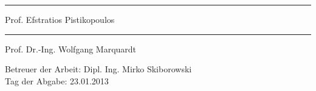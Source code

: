  \vfill{
\begin{flushright}
	\begin{minipage}[r]{10cm}
		\begin{center}
			\hrule\vspace*{2ex}Prof. Efstratios Pistikopoulos\\
			\vspace{2cm}
			\hrule\vspace*{2ex}Prof. Dr.-Ing. Wolfgang Marquardt\\
			\vspace{1cm}
		\end{center}
	\end{minipage}
\end{flushright}
}

Betreuer der Arbeit: Dipl. Ing. Mirko Skiborowski\\
Tag der Abgabe: 23.01.2013
\clearpage
